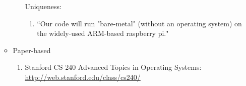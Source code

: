 \documentclass{article}
\begin{document}
\begin{enumerate}
\begin{itemize}
\begin{enumerate}
            Uniqueness:
            \begin{enumerate}
                \item ``Our code will run "bare-metal" (without an operating system) on the widely-used ARM-based raspberry pi."
            \end{enumerate}                    
        \end{enumerate}
        \item Paper-based
        \begin{enumerate}
            \item Stanford CS 240 Advanced Topics in Operating Systems:\\
            \href{http://web.stanford.edu/class/cs240/}{http://web.stanford.edu/class/cs240/}        
        \end{enumerate}

    \end{itemize}


\end{enumerate}
\end{document}

